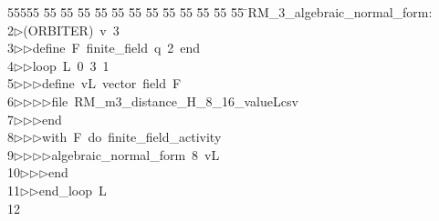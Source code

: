 %
%
\begin{tabbing}
55555 \= 55 \= 55 \= 55 \= 55 \= 55 \= 55 \= 55 \= 55 \= 55 \= 55 \= 55 \= 55 \= \>RM\_3\_algebraic\_normal\_form:\\[0pt]
2\>$\triangleright$\>(ORBITER)\ v\ 3\ \\[0pt]
3\>$\triangleright$\>$\triangleright$\>define\ F\ finite\_field\ q\ 2\ end\ \\[0pt]
4\>$\triangleright$\>$\triangleright$\>loop\ L\ 0\ 3\ 1\ \\[0pt]
5\>$\triangleright$\>$\triangleright$\>$\triangleright$\>define\ vL\ vector\ field\ F\ \\[0pt]
6\>$\triangleright$\>$\triangleright$\>$\triangleright$\>$\triangleright$\>file\ RM\_m3\_distance\_H\_8\_16\_valueLcsv\ \\[0pt]
7\>$\triangleright$\>$\triangleright$\>$\triangleright$\>end\ \\[0pt]
8\>$\triangleright$\>$\triangleright$\>$\triangleright$\>with\ F\ do\ finite\_field\_activity\ \\[0pt]
9\>$\triangleright$\>$\triangleright$\>$\triangleright$\>$\triangleright$\>algebraic\_normal\_form\ 8\ vL\ \\[0pt]
10\>$\triangleright$\>$\triangleright$\>$\triangleright$\>end\ \\[0pt]
11\>$\triangleright$\>$\triangleright$\>end\_loop\ L\\[0pt]
12\>\end{tabbing}
